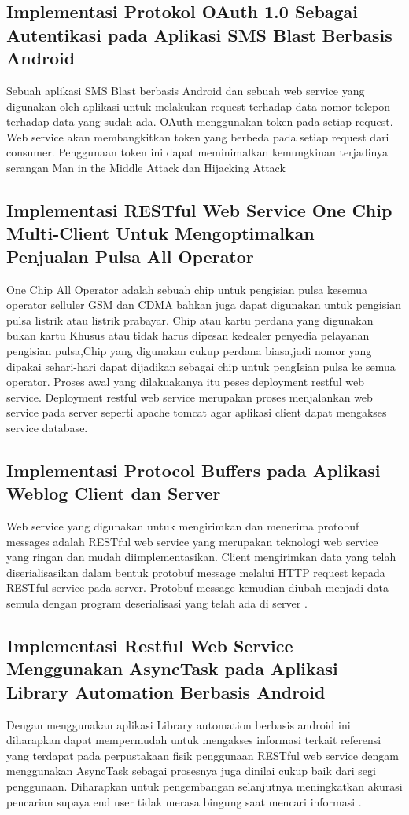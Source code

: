 \subsection{Implementasi Protokol OAuth 1.0 Sebagai Autentikasi pada Aplikasi SMS Blast Berbasis Android}
Sebuah aplikasi SMS Blast berbasis Android dan sebuah web service yang digunakan oleh aplikasi untuk melakukan request terhadap data nomor telepon terhadap data yang sudah ada. OAuth menggunakan token pada setiap request. Web service akan membangkitkan token yang berbeda pada setiap request dari consumer. Penggunaan token ini dapat meminimalkan kemungkinan terjadinya serangan Man in the Middle Attack dan Hijacking Attack
\cite{saputra2017implementasi}

\subsection{Implementasi RESTful Web Service One Chip Multi-Client Untuk Mengoptimalkan Penjualan Pulsa All Operator}
One  Chip  All  Operator adalah sebuah chip untuk pengisian pulsa kesemua operator selluler GSM dan CDMA bahkan juga dapat digunakan untuk pengisian pulsa listrik atau listrik prabayar. Chip atau kartu perdana  yang  digunakan bukan kartu Khusus atau tidak harus dipesan kedealer penyedia pelayanan pengisian pulsa,Chip yang   digunakan cukup perdana biasa,jadi nomor  yang dipakai sehari-hari dapat dijadikan sebagai chip untuk pengIsian pulsa ke semua operator. Proses awal yang dilakuakanya itu peses deployment restful  web  service. Deployment  restful web service  merupakan proses menjalankan web service pada server seperti apache tomcat agar aplikasi client dapat mengakses service database\cite{indrawan2017implementasi}.

\subsection{Implementasi Protocol Buffers pada Aplikasi Weblog Client dan Server}
Web service yang digunakan untuk mengirimkan dan menerima   protobuf  messages adalah  RESTful  web service  yang  merupakan  teknologi  web  service  yang ringan dan mudah diimplementasikan. Client mengirimkan data yang telah diserialisasikan dalam bentuk protobuf message melalui  HTTP  request kepada RESTful  service pada server. Protobuf  message kemudian diubah menjadi data semula dengan program deserialisasi yang telah ada di server \cite{wibowo2011implementasi}.

\subsection{Implementasi Restful Web Service Menggunakan AsyncTask pada Aplikasi Library Automation Berbasis Android}
Dengan menggunakan aplikasi Library automation berbasis android ini diharapkan dapat mempermudah untuk mengakses informasi terkait referensi yang terdapat pada perpustakaan fisik penggunaan RESTful web service dengam menggunakan AsyncTask sebagai prosesnya juga dinilai cukup baik dari segi penggunaan. Diharapkan untuk pengembangan selanjutnya meningkatkan akurasi pencarian supaya end user tidak merasa bingung saat mencari informasi \cite{yudhistiraimplementasi}.


